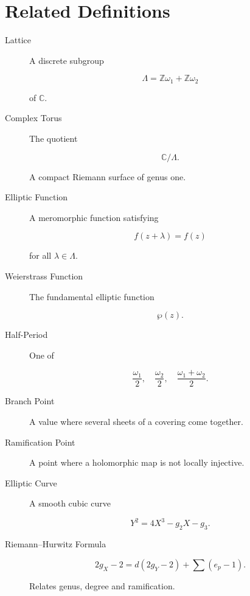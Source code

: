 \documentclass[12pt,a4paper]{article}
\theoremstyle{notespace}
\begin{document}
\section{Related Definitions}

\begin{description}
	
	\item[Lattice]
	A discrete subgroup
	
	\[
	\Lambda=\mathbb Z\omega_1+\mathbb Z\omega_2
	\]
	
	of \(\mathbb C\).
	
	\item[Complex Torus]
	
	The quotient
	
	\[
	\mathbb C/\Lambda.
	\]
	
	A compact Riemann surface of genus one.
	
	\item[Elliptic Function]
	
	A meromorphic function satisfying
	
	\[
	f(z+\lambda)=f(z)
	\]
	
	for all \(\lambda\in\Lambda\).
	
	\item[Weierstrass Function]
	
	The fundamental elliptic function
	
	\[
	\wp(z).
	\]
	
	\item[Half-Period]
	
	One of
	
	\[
	\frac{\omega_1}{2},
	\quad
	\frac{\omega_2}{2},
	\quad
	\frac{\omega_1+\omega_2}{2}.
	\]
	
	\item[Branch Point]
	
	A value where several sheets of a covering come together.
	
	\item[Ramification Point]
	
	A point where a holomorphic map is not locally injective.
	
	\item[Elliptic Curve]
	
	A smooth cubic curve
	
	\[
	Y^2=4X^3-g_2X-g_3.
	\]
	
	\item[Riemann--Hurwitz Formula]
	
	\[
	2g_X-2
	=
	d(2g_Y-2)
	+
	\sum(e_p-1).
	\]
	
	Relates genus, degree and ramification.
	
\end{description}
\end{document}
